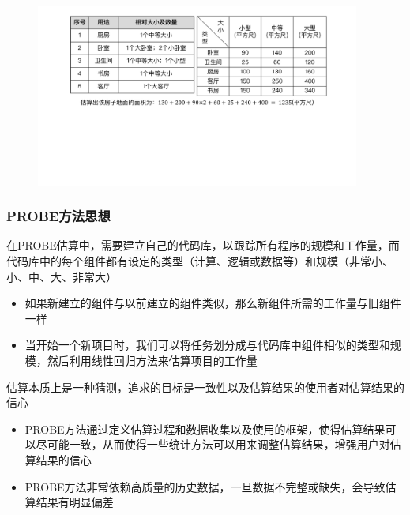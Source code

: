 \begin{figure}[H]
    \vspace{-0.5em}
	\centering
	\includegraphics[width=0.95\textwidth]{images/PROBE方法例子.pdf}
    \vspace{-1em}
\end{figure}

\subsubsection{PROBE方法思想}
在PROBE估算中，需要建立自己的代码库，以跟踪所有程序的规模和工作量，而代码库中的每个组件都有设定的类型（计算、逻辑或数据等）和规模（非常小、小、中、大、非常大）
\begin{itemize}
    \item 如果新建立的组件与以前建立的组件类似，那么新组件所需的工作量与旧组件一样
    \item 当开始一个新项目时，我们可以将任务划分成与代码库中组件相似的类型和规模，然后利用线性回归方法来估算项目的工作量
\end{itemize}

估算本质上是一种猜测，追求的目标是一致性以及估算结果的使用者对估算结果的信心
\begin{itemize}
    \item PROBE方法通过定义估算过程和数据收集以及使用的框架，使得估算结果可以尽可能一致，从而使得一些统计方法可以用来调整估算结果，增强用户对估算结果的信心
    \item PROBE方法非常依赖高质量的历史数据，一旦数据不完整或缺失，会导致估算结果有明显偏差
\end{itemize}

